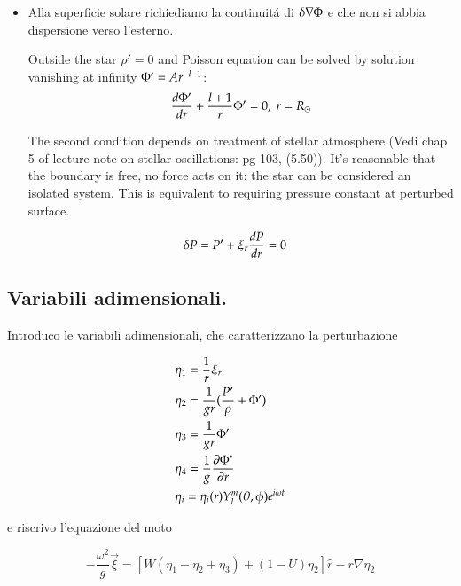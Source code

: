 \documentclass[oneside,12pt,fleqn]{memoir}
\begin{document}
{\begin{itemize}
\begin{align*}
&(l\neq0):\ \xi_r\propto r\expy{l-1};\ (l=0):\ \xi_r\propto r\\
&P',\ \Phi'\propto r^l
\end{align*}

\item Alla superficie solare richiediamo la continuit\'a di $\Lvar{\nabla\Phi}$ e che non si abbia dispersione verso l'esterno.

Outside the star $\rho'=0$ and Poisson equation can be solved by solution vanishing at infinity $\Phi'=Ar\expy{-l-1}$:
\begin{equation*}
\TDy{r}{\Phi'}+\frac{l+1}{r}\Phi'=0,\ r=\rsun{}    
\end{equation*}

The second condition depends on treatment of stellar atmosphere (Vedi chap 5 of lecture note on stellar oscillations: pg 103, (5.50)). It's reasonable that the boundary is free, no force acts on it: the star can be considered an isolated system. This is equivalent to requiring pressure constant at perturbed surface.

\begin{align*}
&\Lvar{P}=P'+\xi_r\TDy{r}{P}=0
\end{align*}

\end{itemize}

\subsection{Variabili adimensionali.}

Introduco le variabili adimensionali, che caratterizzano la perturbazione

\begin{align*}
&\eta_1=\frac{1}{r}\xi_r\\
&\eta_2=\frac{1}{gr}(\frac{P'}{\rho}+\Phi')\\
&\eta_3=\frac{1}{gr}\Phi'\\
&\eta_4=\frac{1}{g}\PDy{r}{\Phi'}\\
&\eta_i=\eta_i(r)Y_l^m(\theta,\phi)\exp{i\omega t}
\end{align*}

e riscrivo l'equazione del moto

\begin{equation*}
-\frac{\omega^2}{g}\vec{\xi}=[W(\eta_1-\eta_2+\eta_3)+(1-U)\eta_2]\hat{r}-r\nabla\eta_2
\end{equation*}

}
\end{document}
